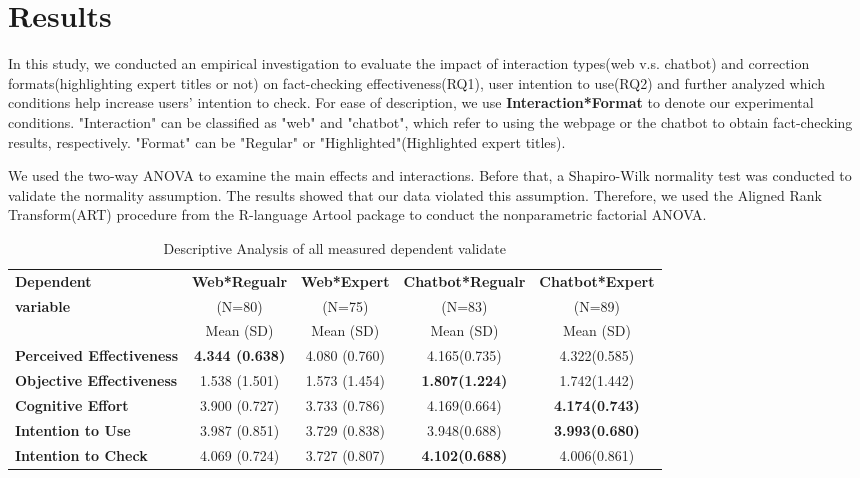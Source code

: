 \section{Results}
In this study, we conducted an empirical investigation to evaluate the impact of interaction types(web v.s. chatbot) and correction formats(highlighting expert titles or not) on fact-checking effectiveness(RQ1), user intention to use(RQ2) and further analyzed which conditions help increase users' intention to check. 
For ease of description, we use \textbf{Interaction*Format} to denote our experimental conditions. 
"Interaction" can be classified as "web" and "chatbot", which refer to using the webpage or the chatbot to obtain fact-checking results, respectively.  
"Format" can be "Regular" or "Highlighted"(Highlighted expert titles).

We used the two-way ANOVA to examine the main effects and interactions.
Before that, a Shapiro-Wilk normality test was conducted to validate the normality assumption. The results showed that our data violated this assumption. 
Therefore, we used the Aligned Rank Transform(ART) procedure from the R-language Artool package to conduct the nonparametric factorial ANOVA.

\begin{table}[width=.9\linewidth,cols=5,pos=h]
    \caption{Descriptive Analysis of all measured dependent validate}\label{tbl1}
    \label{tab:descriptive}
    \begin{tabular*}{\tblwidth}{@{} LCCCC@{} }
    \toprule
    \textbf{Dependent}&\textbf{Web*Regualr}&\textbf{Web*Expert}&\textbf{Chatbot*Regualr} & \textbf{Chatbot*Expert}\\
    \textbf{variable}&(N=80)&(N=75)&(N=83)&(N=89)\\
     & Mean (SD) & Mean (SD) & Mean (SD) & Mean (SD) \\
    \midrule
    \textbf{Perceived Effectiveness}&\textbf{4.344 (0.638)} & 4.080 (0.760) & 4.165(0.735) & 4.322(0.585)\\
    \textbf{Objective Effectiveness}&1.538 (1.501) & 1.573 (1.454) & \textbf{1.807(1.224)} & 1.742(1.442)\\
    \textbf{Cognitive Effort}&3.900 (0.727) & 3.733 (0.786) & 4.169(0.664) & \textbf{4.174(0.743)}\\
    \textbf{Intention to Use}&3.987 (0.851) & 3.729 (0.838) & 3.948(0.688) & \textbf{3.993(0.680)}\\
    \textbf{Intention to Check}&4.069 (0.724) & 3.727 (0.807) & \textbf{4.102(0.688)} & 4.006(0.861)\\
    \bottomrule
    \end{tabular*}
    \end{table} 

